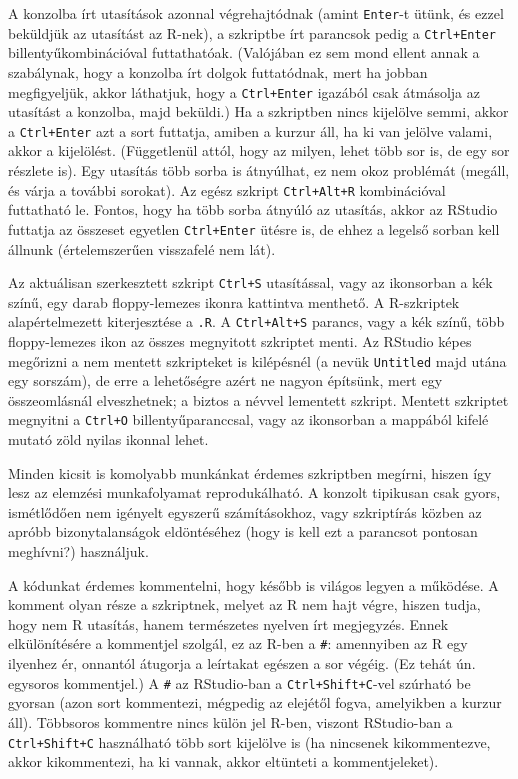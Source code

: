 \documentclass[
]{book}
\begin{document}
A konzolba írt utasítások azonnal végrehajtódnak (amint \texttt{Enter}-t ütünk, és ezzel beküldjük az utasítást az R-nek), a szkriptbe írt parancsok pedig a \texttt{Ctrl+Enter} billentyűkombinációval futtathatóak. (Valójában ez sem mond ellent annak a szabálynak, hogy a konzolba írt dolgok futtatódnak, mert ha jobban megfigyeljük, akkor láthatjuk, hogy a \texttt{Ctrl+Enter} igazából csak átmásolja az utasítást a konzolba, majd beküldi.) Ha a szkriptben nincs kijelölve semmi, akkor a \texttt{Ctrl+Enter} azt a sort futtatja, amiben a kurzur áll, ha ki van jelölve valami, akkor a kijelölést. (Függetlenül attól, hogy az milyen, lehet több sor is, de egy sor részlete is). Egy utasítás több sorba is átnyúlhat, ez nem okoz problémát (megáll, és várja a további sorokat). Az egész szkript \texttt{Ctrl+Alt+R} kombinációval futtatható le. Fontos, hogy ha több sorba átnyúló az utasítás, akkor az RStudio futtatja az összeset egyetlen \texttt{Ctrl+Enter} ütésre is, de ehhez a legelső sorban kell állnunk (értelemszerűen visszafelé nem lát).

Az aktuálisan szerkesztett szkript \texttt{Ctrl+S} utasítással, vagy az ikonsorban a kék színű, egy darab floppy-lemezes ikonra kattintva menthető. A R-szkriptek alapértelmezett kiterjesztése a \texttt{.R}. A \texttt{Ctrl+Alt+S} parancs, vagy a kék színű, több floppy-lemezes ikon az összes megnyitott szkriptet menti. Az RStudio képes megőrizni a nem mentett szkripteket is kilépésnél (a nevük \texttt{Untitled} majd utána egy sorszám), de erre a lehetőségre azért ne nagyon építsünk, mert egy összeomlásnál elveszhetnek; a biztos a névvel lementett szkript. Mentett szkriptet megnyitni a \texttt{Ctrl+O} billentyűparanccsal, vagy az ikonsorban a mappából kifelé mutató zöld nyilas ikonnal lehet.

Minden kicsit is komolyabb munkánkat érdemes szkriptben megírni, hiszen így lesz az elemzési munkafolyamat reprodukálható. A konzolt tipikusan csak gyors, ismétlődően nem igényelt egyszerű számításokhoz, vagy szkriptírás közben az apróbb bizonytalanságok eldöntéséhez (hogy is kell ezt a parancsot pontosan meghívni?) használjuk.

A kódunkat érdemes kommentelni, hogy később is világos legyen a működése. A komment olyan része a szkriptnek, melyet az R nem hajt végre, hiszen tudja, hogy nem R utasítás, hanem természetes nyelven írt megjegyzés. Ennek elkülönítésére a kommentjel szolgál, ez az R-ben a \texttt{\#}: amennyiben az R egy ilyenhez ér, onnantól átugorja a leírtakat egészen a sor végéig. (Ez tehát ún. egysoros kommentjel.) A \texttt{\#} az RStudio-ban a \texttt{Ctrl+Shift+C}-vel szúrható be gyorsan (azon sort kommentezi, mégpedig az elejétől fogva, amelyikben a kurzur áll). Többsoros kommentre nincs külön jel R-ben, viszont RStudio-ban a \texttt{Ctrl+Shift+C} használható több sort kijelölve is (ha nincsenek kikommentezve, akkor kikommentezi, ha ki vannak, akkor eltünteti a kommentjeleket).
\end{document}
